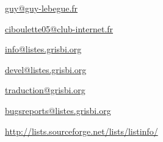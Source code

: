 \urldef{\urlGuyLebegueEmail}%
\url{guy@guy-lebegue.fr}     %

\urldef{\urlMicheleBondilEmail}%
\url{ciboulette05@club-internet.fr}     %

\urldef{\urlListInfoEmail}%
\url{info@listes.grisbi.org}     %

\urldef{\urlListDevelEmail}%
\url{devel@listes.grisbi.org}     %

\urldef{\urlListTraductionEmail}%
\url{traduction@grisbi.org}  %

\urldef{\urlListBugsreport}%
\url{bugsreports@listes.grisbi.org}     %

\urldef{\urlListSF}%
\url{http://lists.sourceforge.net/lists/listinfo/}     %


